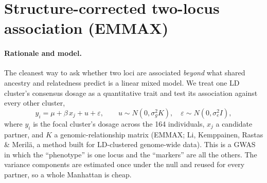 \documentclass[11pt]{article}
\begin{document}
\section{Structure-corrected two-locus association (EMMAX)}
\label{sec:emmax}

\paragraph{Rationale and model.} The cleanest way to ask whether two loci are
associated \emph{beyond} what shared ancestry and relatedness predict is a linear
mixed model. We treat one LD cluster's consensus dosage as a quantitative trait and
test its association against every other cluster,
\begin{equation}
y_i = \mu + \beta\, x_j + u + \varepsilon, \qquad u \sim N(0, \sigma_g^2 K),\quad
\varepsilon \sim N(0, \sigma_e^2 I),
\end{equation}
where $y_i$ is the focal cluster's dosage across the 164 individuals, $x_j$ a
candidate partner, and $K$ a genomic-relationship matrix (EMMAX; Li, Kemppainen,
Rastas \& Meril\"a, a method built for LD-clustered genome-wide data). This is a
GWAS in which the ``phenotype'' is one locus and the ``markers'' are all the others.
The variance components are estimated once under the null and reused for every
partner, so a whole Manhattan is cheap.
\end{document}
